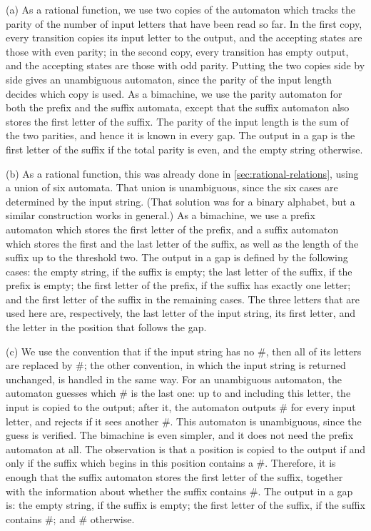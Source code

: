 {
    (a) As a rational function, we use two copies of the automaton which tracks the parity of the number of input letters that have been read so far. In the first copy, every transition copies its input letter to the output, and the accepting states are those with even parity; in the second copy, every transition has empty output, and the accepting states are those with odd parity. Putting the two copies side by side gives an unambiguous automaton, since the parity of the input length decides which copy is used. As a bimachine, we use the parity automaton for both the prefix and the suffix automata, except that the suffix automaton also stores the first letter of the suffix. The parity of the input length is the sum of the two parities, and hence it is known in every gap. The output in a gap is the first letter of the suffix if the total parity is even, and the empty string otherwise.

    (b) As a rational function, this was already done in \cref{sec:rational-relations}, using a union of six automata. That union is unambiguous, since the six cases are determined by the input string.  (That solution was for a binary alphabet, but a similar construction works in general.) As a bimachine, we use a prefix automaton which stores the first letter of the prefix, and a suffix automaton which stores the first and the last letter of the suffix, as well as the length of the suffix up to the threshold two. The output in a gap is defined by the following cases: the empty string, if the suffix is empty; the last letter of the suffix, if the prefix is empty; the first letter of the prefix, if the suffix has exactly one letter; and the first letter of the suffix in the remaining cases. The three letters that are used here are, respectively, the last letter of the input string, its first letter, and the letter in the position that follows the gap.

    (c) We use the convention that if the input string has no $\#$, then all of its letters are replaced by $\#$; the other convention, in which the input string is returned unchanged, is handled in the same way. For an unambiguous automaton, the automaton guesses which $\#$ is the last one: up to and including this letter, the input is copied to the output; after it, the automaton outputs $\#$ for every input letter, and rejects if it sees another $\#$. This automaton is unambiguous, since the guess is verified. The bimachine is even simpler, and it does not need the prefix automaton at all. The observation is that a position is copied to the output if and only if the suffix which begins in this position contains a $\#$. Therefore, it is enough that the suffix automaton stores the first letter of the suffix, together with the information about whether the suffix contains $\#$. The output in a gap is: the empty string, if the suffix is empty; the first letter of the suffix, if the suffix contains $\#$; and $\#$ otherwise.
}

